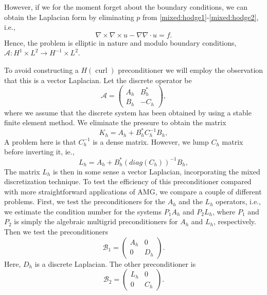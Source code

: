 However, if we for the moment forget about the boundary conditions, 
we can obtain the Laplacian form  by eliminating $p$ 
from \eqref{mixed:hodge1}-\eqref{mixed:hodge2}, i.e.,    
\[
\nabla \times \nabla \times u - \nabla \nabla \cdot u = f .  
\]
Hence, the problem is elliptic
in nature and modulo boundary conditions,  $\mathcal{A}: H^1 \times L^2 \rightarrow  H^{-1} \times L^2$.

To avoid constructing a $H(\operatorname{curl})$ preconditioner we will employ
the observation that this is a vector Laplacian. 
Let the discrete operator be 
\[
\mathcal{A}  =
\begin{pmatrix} A_h & B_h^* \\ B_h & -C_h \end{pmatrix}, 
\]
where we assume that the discrete system has been obtained by using a stable finite
element method. We eliminate the pressure to obtain the matrix 
\[
K_h  = A_h +  B_h^* C^{-1}_h B_h, 
\]
A problem here is that $C^{-1}_h$ is a dense matrix. However, we lump $C_h$ matrix before inverting it, ie.,   
\[
L_h  = A_h +  B_h^* (diag(C_h))^{-1} B_h, 
\]
The matrix $L_h$ is then in some sense a vector Laplacian, incorporating the mixed discretization technique. 
To test the efficiency of this preconditioner compared with 
more straightforward applications of AMG, we compare a couple of different problems.   
First, we test the preconditioners for the $A_h$ and the $L_h$ operators, 
i.e., we estimate the condition number for the systems 
$P_1 A_h$ and $P_2 L_h$, where $P_1$ and $P_2$ is simply the algebraic multigrid 
preconditioners for $A_h$ and $L_h$, respectively. 
Then we test the preconditioners 
\[
\mathcal{B}_1  =
\begin{pmatrix} A_h & 0  \\ 0  & D_h \end{pmatrix}. 
\]
Here, $D_h$ is a discrete Laplacian. The other preconditioner is   
\[
\mathcal{B}_2  =
\begin{pmatrix} L_h & 0  \\ 0  & C_h \end{pmatrix}. 
\]


